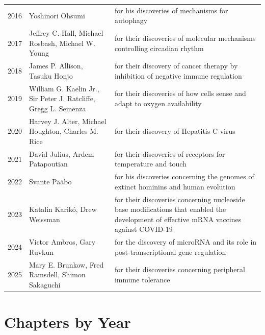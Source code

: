 \documentclass[12pt,a4paper]{book}
\begin{document}
{\begin{longtable}{cp{3.2cm}p{5.5cm}}
2016 & Yoshinori Ohsumi & for his discoveries of mechanisms for autophagy \\
2017 & Jeffrey C. Hall, Michael Rosbash, Michael W. Young & for their discoveries of molecular mechanisms controlling circadian rhythm \\
2018 & James P. Allison, Tasuku Honjo & for their discovery of cancer therapy by inhibition of negative immune regulation \\
2019 & William G. Kaelin Jr., Sir Peter J. Ratcliffe, Gregg L. Semenza & for their discoveries of how cells sense and adapt to oxygen availability \\
2020 & Harvey J. Alter, Michael Houghton, Charles M. Rice & for their discovery of Hepatitis C virus \\
2021 & David Julius, Ardem Patapoutian & for their discoveries of receptors for temperature and touch \\
2022 & Svante P\"a\"abo & for his discoveries concerning the genomes of extinct hominins and human evolution \\
2023 & Katalin Karik\'o, Drew Weissman & for their discoveries concerning nucleoside base modifications that enabled the development of effective mRNA vaccines against COVID-19 \\
2024 & Victor Ambros, Gary Ruvkun & for the discovery of microRNA and its role in post-transcriptional gene regulation \\
2025 & Mary E. Brunkow, Fred Ramsdell, Shimon Sakaguchi & for their discoveries concerning peripheral immune tolerance \\
\bottomrule
\end{longtable}}
\newpage

\part{Chapters by Year}
\end{document}
